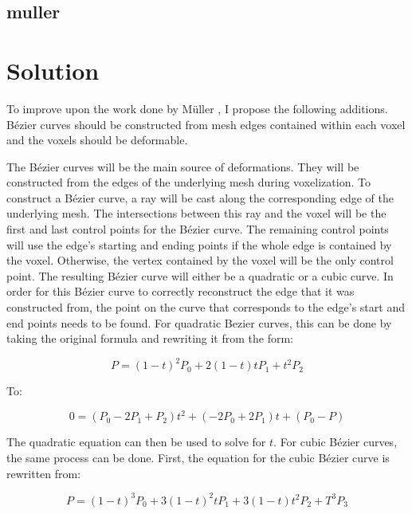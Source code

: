 \subsection{muller}

\section{Solution}
To improve upon the work done by Müller \etal, I propose the following additions. Bézier curves 
should be constructed from mesh edges contained within each voxel and the voxels should be 
deformable.

The Bézier curves will be the main source of deformations. They will be constructed from the edges
of the underlying mesh during voxelization. To construct a Bézier curve, a ray will be cast along 
the corresponding edge of the underlying mesh. The intersections between this ray and the voxel will
be the first and last control points for the Bézier curve. The remaining control points will use the
edge's starting and ending points if the whole edge is contained by the voxel. Otherwise, the vertex
contained by the voxel will be the only control point. The resulting Bézier curve will either be a
quadratic or a cubic curve. In order for this Bézier curve to correctly reconstruct the edge that it
was constructed from, the point on the curve that corresponds to the edge's start and end points 
needs to be found. For quadratic Bezier curves, this can be done by taking the original formula and
rewriting it from the form:

\[P = (1 - t)^2P_0 + 2(1 - t)tP_1 + t^2 P_2\]

\begin{center}
To:
\end{center}
  
\[0 = (P_0 - 2P_1 + P_2)t^2 + (-2P_0 + 2P_1)t + (P_0 - P)\]

The quadratic equation can then be used to solve for \(t\). For cubic Bézier curves, the same 
process can be done. First, the equation for the cubic Bézier curve is rewritten from:

\[P = (1 - t)^3P_0 + 3(1 - t)^2tP_1 + 3(1 - t)t^2P_2 + T^3P_3\]


